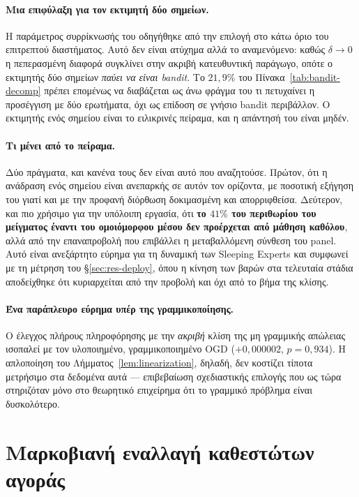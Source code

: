 \documentclass[12pt,a4paper,oneside]{report}
\renewcommand{\_}{\oldunderscore\allowbreak}
\theoremstyle{definition}
\theoremstyle{plain}
\theoremstyle{remark}
\begin{document}
\paragraph{Μια επιφύλαξη για τον εκτιμητή δύο σημείων.} Η παράμετρος συρρίκνωσής του
οδηγήθηκε από την επιλογή στο κάτω όριο του επιτρεπτού διαστήματος. Αυτό δεν είναι ατύχημα
αλλά το αναμενόμενο: καθώς $\delta\to 0$ η πεπερασμένη διαφορά συγκλίνει στην ακριβή
κατευθυντική παράγωγο, οπότε ο εκτιμητής δύο σημείων \emph{παύει να είναι bandit}. Το
$21{,}9\%$ του Πίνακα~\ref{tab:bandit-decomp} πρέπει επομένως να διαβάζεται ως άνω φράγμα
του τι πετυχαίνει η προσέγγιση με δύο ερωτήματα, όχι ως επίδοση σε γνήσιο bandit
περιβάλλον. Ο εκτιμητής ενός σημείου είναι το ειλικρινές πείραμα, και η απάντησή του είναι
μηδέν.

\paragraph{Τι μένει από το πείραμα.} Δύο πράγματα, και κανένα τους δεν είναι αυτό που
αναζητούσε. Πρώτον, ότι η ανάδραση ενός σημείου είναι ανεπαρκής σε αυτόν τον ορίζοντα, με
ποσοτική εξήγηση του γιατί και με την προφανή διόρθωση δοκιμασμένη και απορριφθείσα.
Δεύτερον, και πιο χρήσιμο για την υπόλοιπη εργασία, ότι \textbf{το $41\%$ του περιθωρίου του
μείγματος έναντι του ομοιόμορφου μέσου δεν προέρχεται από μάθηση καθόλου}, αλλά από την
επαναπροβολή που επιβάλλει η μεταβαλλόμενη σύνθεση του panel. Αυτό είναι ανεξάρτητο εύρημα
για τη δυναμική των Sleeping Experts και συμφωνεί με τη μέτρηση του
\S\ref{sec:res-deploy}, όπου η κίνηση των βαρών στα τελευταία στάδια αποδείχθηκε ότι
κυριαρχείται από την προβολή και όχι από το βήμα της κλίσης.

\paragraph{Ένα παράπλευρο εύρημα υπέρ της γραμμικοποίησης.} Ο έλεγχος πλήρους πληροφόρησης
με την \emph{ακριβή} κλίση της μη γραμμικής απώλειας ισοπαλεί με τον υλοποιημένο,
γραμμικοποιημένο OGD ($+0{,}000002$, $p=0{,}934$). Η απλοποίηση του
Λήμματος~\ref{lem:linearization}, δηλαδή, δεν κοστίζει τίποτα μετρήσιμο στα δεδομένα αυτά ---
επιβεβαίωση σχεδιαστικής επιλογής που ως τώρα στηριζόταν μόνο στο θεωρητικό επιχείρημα ότι
το γραμμικό πρόβλημα είναι δυσκολότερο.

\section{Μαρκοβιανή εναλλαγή καθεστώτων αγοράς}
\label{sec:res-regime}
\end{document}
